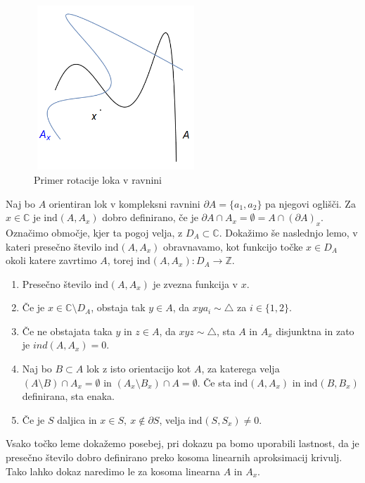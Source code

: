 \documentclass[mat1]{fmfdelo}
\newcommand{\Z}{\mathbb Z}
\newcommand{\C}{\mathbb C}
\newcommand{\ind}[3][]{\text{ind}_{#1}(#2, #3)}
\begin{document}
\begin{figure}[h!]
\centering
\includegraphics[width = 175pt, height = 175pt]{rotacija_zacetna.png}
\caption{Primer rotacije loka v ravnini}
\label{fig:rotacija_osnovna}
\end{figure}

Naj bo $A$ orientiran lok v kompleksni ravnini $\partial A = \{a_1, a_2\}$ pa njegovi oglišči. Za $x\in \C$ je $\ind{A}{A_x}$ dobro definirano, če je $\partial A \cap A_x = \emptyset = A \cap (\partial A)_x$. Označimo območje, kjer ta pogoj velja, z $D_A \subset \C$. Dokažimo še naslednjo lemo, v kateri presečno število $\ind{A}{A_x}$ obravnavamo, kot funkcijo točke $x \in D_A$ okoli katere zavrtimo $A$, torej $\ind{A}{A_x} \colon D_A \to \Z$.

\begin{lema}\label{le:lema2}
\begin{enumerate}
\item Presečno število $\ind{A}{A_x}$ je zvezna funkcija v $x$.
\item Če je $x \in \C \setminus D_A$, obstaja tak $y \in A$, da $xya_i \sim \triangle$ za $i \in \{1, 2\}$.
\item Če ne obstajata taka $y$ in $z \in A$, da $xyz \sim \triangle$, sta $A$ in $A_x$ disjunktna in zato je $ind(A, A_x) = 0$.
\item Naj bo $B \subset A$ lok z isto orientacijo kot $A$, za katerega velja $(A \setminus B) \cap A_x = \emptyset$ in $(A_x \setminus B_x) \cap A = \emptyset$. Če sta $\ind{A}{A_x}$ in $\ind{B}{B_x}$ definirana, sta enaka.
\item Če je $S$ daljica in $x \in S,\ x \notin \partial S$, velja $\ind{S}{S_x} \neq 0$.
\end{enumerate}
\end{lema}

\proof
Vsako točko leme dokažemo posebej, pri dokazu pa bomo uporabili lastnost, da je presečno število dobro definirano preko kosoma linearnih aproksimacij krivulj. Tako lahko dokaz naredimo le za kosoma linearna $A$ in $A_x$.
\end{document}

